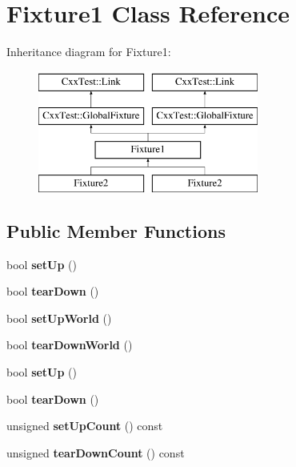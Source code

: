 \hypertarget{classFixture1}{\section{Fixture1 Class Reference}
\label{classFixture1}
}
Inheritance diagram for Fixture1\-:\begin{figure}[H]
\begin{center}
\leavevmode
\includegraphics[height=4.000000cm]{classFixture1}
\end{center}
\end{figure}
\subsection*{Public Member Functions}
\begin{DoxyCompactItemize}
\item 
\hypertarget{classFixture1_add920b52688f1d7dcd0cc707d8c20975}{bool {\bfseries set\-Up} ()}\label{classFixture1_add920b52688f1d7dcd0cc707d8c20975}

\item 
\hypertarget{classFixture1_a9eb75c966931827abd4ae37ca7b83208}{bool {\bfseries tear\-Down} ()}\label{classFixture1_a9eb75c966931827abd4ae37ca7b83208}

\item 
\hypertarget{classFixture1_ae287a60f3709a69699744c7fb3abedeb}{bool {\bfseries set\-Up\-World} ()}\label{classFixture1_ae287a60f3709a69699744c7fb3abedeb}

\item 
\hypertarget{classFixture1_a02aaa8adfed0aa20e4e46c97ddbfa467}{bool {\bfseries tear\-Down\-World} ()}\label{classFixture1_a02aaa8adfed0aa20e4e46c97ddbfa467}

\item 
\hypertarget{classFixture1_add920b52688f1d7dcd0cc707d8c20975}{bool {\bfseries set\-Up} ()}\label{classFixture1_add920b52688f1d7dcd0cc707d8c20975}

\item 
\hypertarget{classFixture1_a9eb75c966931827abd4ae37ca7b83208}{bool {\bfseries tear\-Down} ()}\label{classFixture1_a9eb75c966931827abd4ae37ca7b83208}

\item 
\hypertarget{classFixture1_ac46fd4df91b45f32c2d5cbb3e805ed08}{unsigned {\bfseries set\-Up\-Count} () const }\label{classFixture1_ac46fd4df91b45f32c2d5cbb3e805ed08}

\item 
\hypertarget{classFixture1_a2290f361acd0c3ffe40c8a7faca501c0}{unsigned {\bfseries tear\-Down\-Count} () const }\label{classFixture1_a2290f361acd0c3ffe40c8a7faca501c0}

\end{DoxyCompactItemize}
